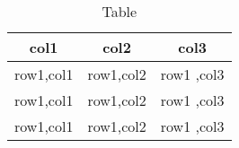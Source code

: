 \documentclass{article}
\begin{document}
	\begin{table}
		\centering 
		\begin{tabular}{|c|c|c|}
			\hline
			col1 & col2 & col3\\
			\hline
			row1,col1 & row1,col2 & row1 ,col3\\
				row1,col1 & row1,col2 & row1 ,col3\\
					row1,col1 & row1,col2 & row1 ,col3\\
					\hline
				\end{tabular}
	\caption{Table}
	\end{table}
\end{document}
